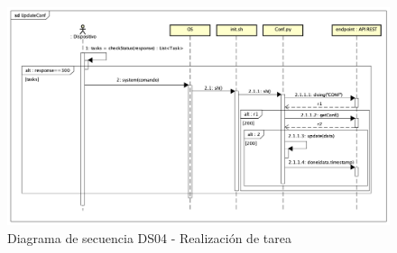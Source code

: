 \begin{figure}[H]
    \centering
    \includegraphics[width=14cm]{./img/sequence/diagram/conftask.png}
    \caption{Diagrama de secuencia DS04 - Realización de tarea}
    \label{fig:seq.alive}
\end{figure}
